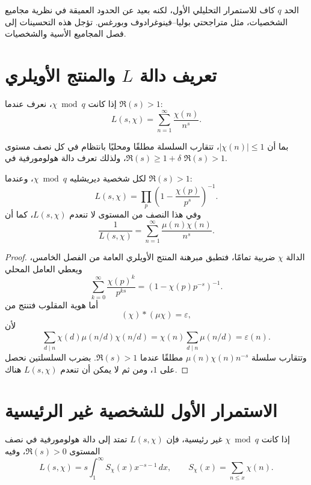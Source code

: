 \begin{remark}
الحد \(q\) كاف للاستمرار التحليلي الأول، لكنه بعيد عن الحدود العميقة في
نظرية مجاميع الشخصيات، مثل متراجحتي بوليا--فينوغرادوف وبورغس. تؤجل هذه
التحسينات إلى فصل المجاميع الأسية والشخصيات.
\end{remark}

\section{تعريف دالة \(L\) والمنتج الأويلري}

\begin{definition}
إذا كانت \(\chi\bmod q\)، نعرف عندما \(\Re(s)>1\):
\[
L(s,\chi)
=
\sum_{n=1}^{\infty}\frac{\chi(n)}{n^s}.
\]
\end{definition}

بما أن \(|\chi(n)|\leq1\)، تتقارب السلسلة مطلقًا ومحليًا بانتظام في
كل نصف مستوى \(\Re(s)\geq1+\delta\)، ولذلك تعرف دالة هولومورفية في
\(\Re(s)>1\).

\begin{theorem}
\label{thm:dirichlet-l-euler-product}
\provedhere
لكل شخصية ديريشليه \(\chi\bmod q\)، وعندما \(\Re(s)>1\):
\[
L(s,\chi)
=
\prod_p\left(1-\frac{\chi(p)}{p^s}\right)^{-1}.
\]
وفي هذا النصف من المستوى لا تنعدم \(L(s,\chi)\)، كما أن
\[
\frac1{L(s,\chi)}
=
\sum_{n=1}^{\infty}\frac{\mu(n)\chi(n)}{n^s}.
\]
\end{theorem}

\begin{proof}
الدالة \(\chi\) ضربية تمامًا، فتطبق مبرهنة المنتج الأويلري العامة من
الفصل الخامس، ويعطي العامل المحلي
\[
\sum_{k=0}^{\infty}\frac{\chi(p)^k}{p^{ks}}
=
\left(1-\chi(p)p^{-s}\right)^{-1}.
\]
أما هوية المقلوب فتنتج من
\[
(\chi)*(\mu\chi)=\varepsilon,
\]
لأن
\[
\sum_{d\mid n}\chi(d)\mu(n/d)\chi(n/d)
=
\chi(n)\sum_{d\mid n}\mu(n/d)
=
\varepsilon(n).
\]
وتتقارب سلسلة \(\mu(n)\chi(n)n^{-s}\) مطلقًا عندما \(\Re(s)>1\).
بضرب السلسلتين نحصل على \(1\)، ومن ثم لا يمكن أن تنعدم
\(L(s,\chi)\) هناك.
\end{proof}

\section{الاستمرار الأول للشخصية غير الرئيسية}

\begin{theorem}
\label{thm:nonprincipal-l-continuation}
\provedhere
إذا كانت \(\chi\bmod q\) غير رئيسية، فإن \(L(s,\chi)\) تمتد إلى دالة
هولومورفية في نصف المستوى \(\Re(s)>0\)، وفيه
\[
L(s,\chi)
=
s\int_1^{\infty}S_\chi(x)x^{-s-1}\,dx,
\qquad
S_\chi(x)=\sum_{n\leq x}\chi(n).
\]
\end{theorem}

